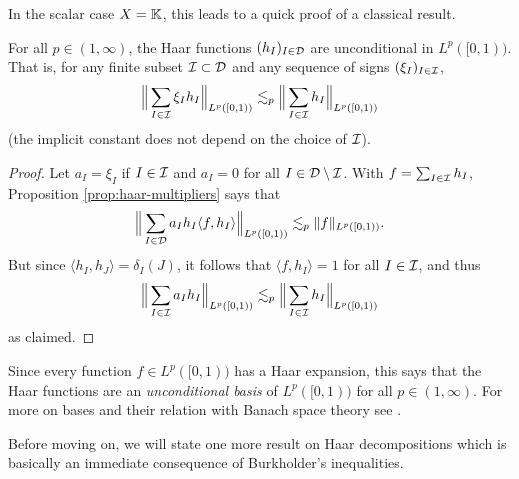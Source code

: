 In the scalar case $X = \mathbb{K}$, this leads to a quick proof of a classical result.

\begin{cor}
  For all $p \in (1,\infty)$, the Haar functions $(h_{I})_{I \in \mathcal{D}}$ are unconditional in $L^p([0,1))$.
  That is, for any finite subset $\mathcal{I} \subset \mathcal{D}$ and any sequence of signs $(\xi_{I})_{I \in \mathcal{I}}$,
  \begin{equation*}
    \Big\| \sum_{I \in \mathcal{I}} \xi_{I} h_{I} \Big\|_{L^p([0,1))} \lesssim_{p} \Big\| \sum_{I \in \mathcal{I}} h_{I} \Big\|_{L^p([0,1))}
  \end{equation*}
  (the implicit constant does not depend on the choice of $\mathcal{I}$).
\end{cor}

\begin{proof}
  Let $a_{I} = \xi_{I}$ if $I \in \mathcal{I}$ and $a_{I} = 0$ for all $I \in \mathcal{D} \setminus \mathcal{I}$.
  With $f = \sum_{I \in \mathcal{I}} h_{I}$, Proposition \ref{prop:haar-multipliers} says that
  \begin{equation*}
    \Big\|\sum_{I \in \mathcal{D}} a_{I} h_{I} \langle f, h_{I} \rangle \Big\|_{L^p([0,1))} \lesssim_{p} \|f\|_{L^p([0,1))}.
  \end{equation*}
  But since $\langle h_{I}, h_{J} \rangle = \delta_{I}(J)$, it follows that $\langle f, h_{I} \rangle = 1$ for all $I \in \mathcal{I}$, and thus
  \begin{equation*}
    \Big\|\sum_{I \in \mathcal{I}} a_{I} h_{I} \Big\|_{L^p([0,1))} \lesssim_{p} \Big\| \sum_{I \in \mathcal{I}} h_{I}\Big\|_{L^p([0,1))}
  \end{equation*}
  as claimed.
\end{proof}

Since every function $f \in L^p([0,1))$ has a Haar expansion, this says that the Haar functions are an \emph{unconditional basis} of $L^p([0,1))$ for all $p \in (1,\infty)$.
For more on bases and their relation with Banach space theory see \cite{AK06}.

Before moving on, we will state one more result on Haar decompositions which is basically an immediate consequence of Burkholder's inequalities.


